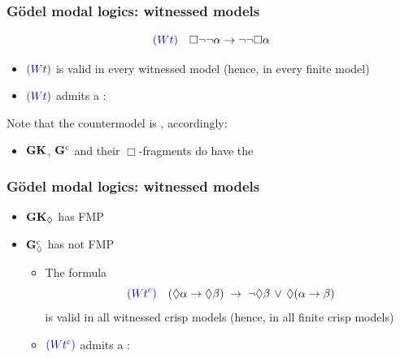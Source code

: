 \begin{frame}
\frametitle{G\"odel modal logics: witnessed models}




\[
{\color{blue} (Wt)} \quad \Box \neg\neg \alpha \to \neg\neg \Box \alpha
\]
\begin{itemize}

\item ${\color{blue} (Wt)}$ is valid in every witnessed model (hence, in every finite model)


  \smallskip
\item  ${\color{blue} (Wt)}$ admits a :


  
\smallskip
\end{itemize}

Note that the countermodel is , accordingly:


\smallskip
\begin{itemize}
\item $\mathbf{GK}$,  $\mathbf{G}^\mathrm{c}$  and their $\Box$-fragments do {} have  the 


\end{itemize}




  \VFILL
  
\end{frame}





\begin{frame}
\frametitle{G\"odel modal logics: witnessed models}


  \begin{itemize}
  
  \item  $\mathbf{GK}_\Diamond$ has FMP



  \item  $\mathbf{G}^\mathrm{c}_\Diamond$ has not FMP
    \begin{itemize}
    \item[-] The formula
      \[
{\color{blue} (Wt^c)}\quad (\lozenge\alpha\to\lozenge\beta)\;\to\;\neg \lozenge \beta \,\lor\,\lozenge(\alpha\to\beta)
        \]
        is valid in all witnessed crisp models  (hence, in all finite crisp models)

     \item[-] ${\color{blue} (Wt^c)}$ admits a :  



    \end{itemize}

\end{itemize}


\end{frame}




